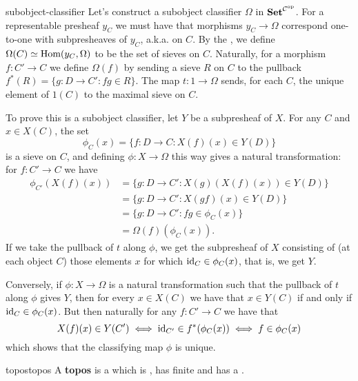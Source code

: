 \begin{example}{subobject-classifier}
    Let's construct a subobject classifier $\Omega$ in $\textbf{Set}^{\mathcal{C}^\textup{op}}$. For a representable presheaf $y_C$ we must have that morphisms $y_C \to \Omega$ correspond one-to-one with subpresheaves of $y_C$, a.k.a.  on $C$. By the , we define $\Omega(C) \simeq \text{Hom}(y_C, \Omega)$ to be the set of sieves on $C$. Naturally, for a morphism $f : C' \to C$ we define $\Omega(f)$ by sending a sieve $R$ on $C$ to the pullback $f^*(R) = \{ g : D \to C' : fg \in R \}$. The map $t : 1 \to \Omega$ sends, for each $C$, the unique element of $1(C)$ to the maximal sieve on $C$.
    
    To prove this is a subobject classifier, let $Y$ be a subpresheaf of $X$. For any $C$ and $x \in X(C)$, the set
    \[ \phi_C(x) = \{ f : D \to C : X(f)(x) \in Y(D) \} \]
    is a sieve on $C$, and defining $\phi : X \to \Omega$ this way gives a natural transformation: for $f : C' \to C$ we have
    \[ \begin{aligned}
        \phi_{C'}(X(f)(x))
            &= \{ g : D \to C' : X(g)(X(f)(x)) \in Y(D) \} \\
            &= \{ g : D \to C' : X(gf)(x) \in Y(D) \} \\
            &= \{ g : D \to C' : fg \in \phi_C(x) \} \\
            &= \Omega(f)(\phi_C(x)) .
    \end{aligned} \]
    If we take the pullback of $t$ along $\phi$, we get the subpresheaf of $X$ consisting of (at each object $C$) those elements $x$ for which $\text{id}_C \in \phi_C(x)$, that is, we get $Y$.
    
    Conversely, if $\phi : X \to \Omega$ is a natural transformation such that the pullback of $t$ along $\phi$ gives $Y$, then for every $x \in X(C)$ we have that $x \in Y(C)$ if and only if $\text{id}_C \in \phi_C(x)$. But then naturally for any $f : C' \to C$ we have that
    \[ X(f)(x) \in Y(C') \iff \text{id}_{C'} \in f^*(\phi_C(x)) \iff f \in \phi_C(x) \]
    which shows that the classifying map $\phi$ is unique.
\end{example}

\begin{topic}{topos}{topos}
    A \textbf{topos} is a  which is , has finite  and has a .
\end{topic}

